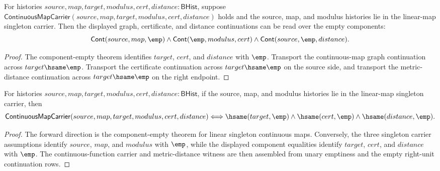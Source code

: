 \begin{theorem}
\label{thm:funcobj-linear-singleton-continuous-map-empty-graphs}
For histories $source,map,target,modulus,cert,distance:\mathsf{BHist}$, suppose
$\mathsf{ContinuousMapCarrier}(source,map,target,modulus,cert,distance)$ holds
and the source, map, and modulus histories lie in the linear-map singleton
carrier. Then the displayed graph, certificate, and distance continuations can
be read over the empty components:
$$
\mathsf{Cont}(source,map,\emp)\land
\mathsf{Cont}(\emp,modulus,cert)\land
\mathsf{Cont}(source,\emp,distance).
$$
\end{theorem}
\begin{proof}
The component-empty theorem identifies $target$, $cert$, and $distance$ with
$\emp$. Transport the continuous-map graph continuation across
$target\hsame\emp$. Transport the certificate continuation across
$target\hsame\emp$ on the source side, and transport the metric-distance
continuation across $target\hsame\emp$ on the right endpoint.
\end{proof}

\begin{theorem}
\label{thm:funcobj-linear-singleton-continuous-map-empty-components-iff}
For histories $source,map,target,modulus,cert,distance:\mathsf{BHist}$, if
the source, map, and modulus histories lie in the linear-map singleton
carrier, then
$$
\mathsf{ContinuousMapCarrier}(source,map,target,modulus,cert,distance)
\Longleftrightarrow
\hsame(target,\emp)\land\hsame(cert,\emp)\land\hsame(distance,\emp).
$$
\end{theorem}
\begin{proof}
The forward direction is the component-empty theorem for linear singleton
continuous maps. Conversely, the three singleton carrier assumptions identify
$source$, $map$, and $modulus$ with $\emp$, while the displayed component
equalities identify $target$, $cert$, and $distance$ with $\emp$. The
continuous-function carrier and metric-distance witness are then assembled
from unary emptiness and the empty right-unit continuation rows.
\end{proof}

